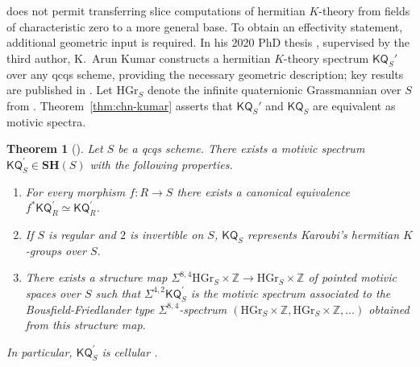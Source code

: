 \documentclass[11pt,hyp,english]{article}
\newcommand{\Z}{\mathbb{Z}}
\newcommand{\unit}{\mathds{1}}
\newcommand{\KGL}{\mathsf{KGL}}
\newcommand{\KQ}{\mathsf{KQ}}
\newcommand{\SH}{\mathbf{SH}}
\newcommand{\Th}{\operatorname{Th}}
\newcommand{\HGr}{\mathrm{HGr}}
\newcommand{\Forg}{\mathsf{Forg}}
\newcommand{\Hyper}{\mathsf{Hyp}}
\let\smash=\wedge
\newtheorem{theorem}{Theorem}[section]
\theoremstyle{definition}
\begin{document}
 does not permit transferring slice computations of hermitian $K$-theory from fields of characteristic zero to a more general base. To obtain an effectivity statement, additional geometric input is required. In his 2020 PhD thesis \cite{kumar.thesis}, supervised by the third author, K.~Arun Kumar constructs a hermitian $K$-theory spectrum $\KQ_S'$ over any qcqs scheme, providing the necessary geometric description; key results are published in \cite{kumar}. Let $\HGr_S$ denote the infinite quaternionic Grassmannian over $S$ from \cite{panin-walter.quat-borel}. Theorem~\ref{thm:chn-kumar} asserts that $\KQ_S'$ and $\KQ_S$ are equivalent as motivic spectra.

\begin{theorem}[\cite{kumar.thesis}]
Let $S$ be a qcqs scheme. 
There exists a motivic spectrum $\KQ_S^\prime\in \SH(S)$ with the following properties.
\begin{enumerate}
    \item[$3^\prime$.] For every morphism $f\colon R\to S$ there exists a canonical equivalence $f^\ast \KQ_R^\prime\simeq \KQ_R^\prime$.
    \item[$6^\prime$.] If $S$ is regular and $2$ is invertible on $S$, $\KQ_S$ represents Karoubi's hermitian $K$-groups over $S$.
    \item[$7^\prime$.] There exists a structure map $\Sigma^{8,4}\HGr_S\times \Z \to \HGr_S\times \Z$ of pointed motivic spaces over $S$ such that $\Sigma^{4,2}\KQ_S^\prime$ is the motivic spectrum associated to the Bousfield-Friedlander type $\Sigma^{8,4}$-spectrum $(\HGr_S\times \Z,\HGr_S\times \Z,\dotsc)$ obtained from this structure map.
\end{enumerate}
In particular, $\KQ^\prime_S$ is cellular \cite{rso.cell}.
\end{theorem}
\end{document}
